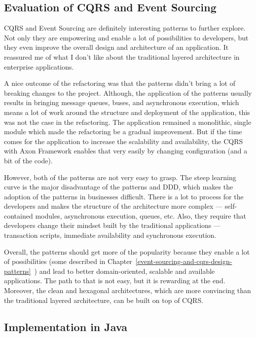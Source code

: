 \documentclass{book}
\begin{document}
\subsection{Evaluation of CQRS and Event
Sourcing}\label{evaluation-of-cqrs-and-event-sourcing}

CQRS and Event Sourcing are definitely interesting patterns to further
explore. Not only they are empowering and enable a lot of possibilities
to developers, but they even improve the overall design and architecture
of an application. It reassured me of what I don't like about the
traditional layered architecture in enterprise applications.

A nice outcome of the refactoring was that the patterns didn't bring a
lot of breaking changes to the project. Although, the application of the
patterns usually results in bringing message queues, buses, and
asynchronous execution, which means a lot of work around the structure
and deployment of the application, this was not the case in the
refactoring. The application remained a monolithic, single module which
made the refactoring be a gradual improvement. But if the time comes for
the application to increase the scalability and availability, the CQRS
with Axon Framework enables that very easily by changing configuration
(and a bit of the code).

However, both of the patterns are not very easy to grasp. The steep
learning curve is the major disadvantage of the patterns and DDD, which
makes the adoption of the patterns in businesses difficult. There is a
lot to process for the developers and makes the structure of the
architecture more complex --- self-contained modules, asynchronous
execution, queues, etc. Also, they require that developers change their
mindset built by the traditional applications --- transaction scripts,
immediate availability and synchronous execution.

Overall, the patterns should get more of the popularity because they
enable a lot of possibilities (some described in Chapter~\ref{event-sourcing-and-cqrs-design-patterns}~) and lead to better
domain-oriented, scalable and available applications. The path to that
is not easy, but it is rewarding at the end. Moreover, the clean and
hexagonal architectures, which are more convincing than the traditional
layered architecture, can be built on top of CQRS.

\subsection{Implementation in Java}\label{implementation-in-java}
\end{document}
